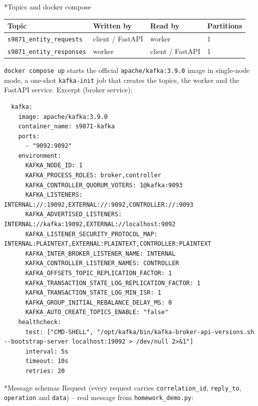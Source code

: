 \documentclass[11pt]{article}
\makeatletter
\renewcommand\subsection{\@startsection{subsection}{2}{\z@}{-2.2ex \@plus -1ex \@minus -.2ex}{0.8ex \@plus.2ex}{\normalfont\fontsize{12}{14.5}\selectfont\bfseries}}
\makeatother
\begin{document}
\subsection*{Topics and docker compose}
\begin{center}
{\small
\begin{tabular}{llll}
\toprule
\textbf{Topic} & \textbf{Written by} & \textbf{Read by} & \textbf{Partitions} \\
\midrule
\texttt{s9871\_\allowbreak{}entity\_\allowbreak{}requests} & client / FastAPI & worker & 1 \\
\texttt{s9871\_\allowbreak{}entity\_\allowbreak{}responses} & worker & client / FastAPI & 1 \\
\bottomrule
\end{tabular}}
\end{center}
\texttt{docker compose up} starts the official \texttt{apache/\allowbreak{}kafka:3.9.0} image in single-node mode, a one-shot \texttt{kafka-init} job that creates the topics, the worker and the FastAPI service. Excerpt (broker service):

\begin{minipage}{\linewidth}
\begingroup\lstset{basicstyle=\ttfamily\tiny}
\begin{lstlisting}
  kafka:
    image: apache/kafka:3.9.0
    container_name: s9871-kafka
    ports:
      - "9092:9092"
    environment:
      KAFKA_NODE_ID: 1
      KAFKA_PROCESS_ROLES: broker,controller
      KAFKA_CONTROLLER_QUORUM_VOTERS: 1@kafka:9093
      KAFKA_LISTENERS: INTERNAL://:19092,EXTERNAL://:9092,CONTROLLER://:9093
      KAFKA_ADVERTISED_LISTENERS: INTERNAL://kafka:19092,EXTERNAL://localhost:9092
      KAFKA_LISTENER_SECURITY_PROTOCOL_MAP: INTERNAL:PLAINTEXT,EXTERNAL:PLAINTEXT,CONTROLLER:PLAINTEXT
      KAFKA_INTER_BROKER_LISTENER_NAME: INTERNAL
      KAFKA_CONTROLLER_LISTENER_NAMES: CONTROLLER
      KAFKA_OFFSETS_TOPIC_REPLICATION_FACTOR: 1
      KAFKA_TRANSACTION_STATE_LOG_REPLICATION_FACTOR: 1
      KAFKA_TRANSACTION_STATE_LOG_MIN_ISR: 1
      KAFKA_GROUP_INITIAL_REBALANCE_DELAY_MS: 0
      KAFKA_AUTO_CREATE_TOPICS_ENABLE: "false"
    healthcheck:
      test: ["CMD-SHELL", "/opt/kafka/bin/kafka-broker-api-versions.sh --bootstrap-server localhost:19092 > /dev/null 2>&1"]
      interval: 5s
      timeout: 10s
      retries: 20
\end{lstlisting}
\endgroup
\end{minipage}
\subsection*{Message schemas}
Request (every request carries \texttt{correlation\_\allowbreak{}id}, \texttt{reply\_\allowbreak{}to}, \texttt{operation} and \texttt{data}) -- real message from \texttt{homework\_\allowbreak{}demo.py}:
\end{document}
